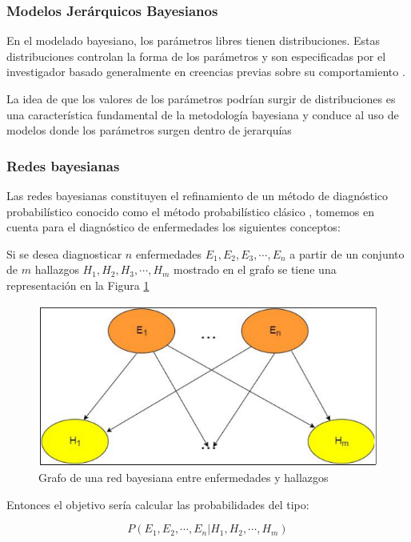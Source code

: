 \subsubsection{Modelos Jerárquicos Bayesianos}
En el modelado bayesiano, los parámetros libres tienen distribuciones. Estas distribuciones controlan la forma de los parámetros y son especificadas por el investigador basado generalmente en creencias previas sobre su comportamiento \citep{lawson2018bayesian}. 

La idea de que los valores de los parámetros podrían surgir de distribuciones es una característica fundamental de la metodología bayesiana y conduce al uso de modelos donde los parámetros surgen dentro de jerarquías

\subsubsection{Redes bayesianas}
Las redes bayesianas constituyen el refinamiento de un método de diagnóstico probabilístico conocido como el método probabilístico clásico \citep{koski2011bayesian}, tomemos en cuenta para el diagnóstico de enfermedades los siguientes conceptos:

Si se desea diagnosticar $n$ enfermedades ${E}_{1},{E}_{2},{E}_{3}, \cdots, {E}_{n}$ a partir de un conjunto de $m$ hallazgos ${H}_{1}, {H}_{2}, {H}_{3}, \cdots, {H}_{m}$ mostrado en el grafo se tiene una representación en la Figura \ref{figura:red_bayesiana}

\begin{figure}[htb]
\centering
\includegraphics[scale=0.7]{images/redes_bayesianas.png}
\caption{Grafo de una red bayesiana entre enfermedades y hallazgos}
\label{figura:red_bayesiana}
\end{figure}

Entonces el objetivo sería calcular las probabilidades del tipo:

$$
P({E}_{1}, {E}_{2}, \cdots, {E}_{n} | {H}_{1}, {H}_{2}, \cdots, {H}_{m})
$$

